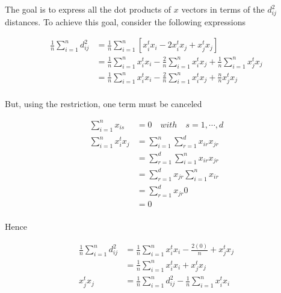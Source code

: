 \documentclass[12pt,journal]{IEEEtran}
\begin{document}
    The goal is to express all the dot products of $x$ vectors in terms of the
    $d_{ij}^2$ distances. To achieve this goal, consider the following
    expressions

    \begin{equation*}
        \begin{aligned}
            \frac{1}{n} \sum_{i=1}^n d_{ij}^2 &= \frac{1}{n} \sum_{i=1}^n [x_i^t x_i - 2 x_i^t x_j + x_j^t x_j]\\
            &=  \frac{1}{n} \sum_{i=1}^n x_i^t x_i - \frac{2}{n} \sum_{i=1}^n x_i^t x_j + \frac{1}{n} \sum_{i=1}^n x_j^t x_j\\
            &=  \frac{1}{n} \sum_{i=1}^n x_i^t x_i - \frac{2}{n} \sum_{i=1}^n x_i^t x_j + \frac{n}{n} x_j^t x_j \\
        \end{aligned}
    \end{equation*}

    But, using the restriction, one term must be canceled

    \begin{equation*}
        \begin{aligned}
              \sum_{i=1}^n x_{is} &= 0 \quad with \quad s = 1, \cdots, d\\
            \sum_{i=1}^n x_i^t x_j &= \sum_{i=1}^n \sum_{r=1}^d x_{ir} x_{jr}\\
                                   &= \sum_{r=1}^d \sum_{i=1}^n x_{ir} x_{jr}\\
                                   &= \sum_{r=1}^d x_{jr} \sum_{i=1}^n x_{ir}\\
                                   &= \sum_{r=1}^d x_{jr} 0\\
                                   &= 0\\
        \end{aligned}
    \end{equation*}

    Hence

    \begin{equation*}
        \begin{aligned}
            \frac{1}{n} \sum_{i=1}^n d_{ij}^2
            &=
            \frac{1}{n} \sum_{i=1}^n x_i^t x_i - \frac{2(0)}{n} + x_j^t x_j\\
            &=
            \frac{1}{n} \sum_{i=1}^n x_i^t x_i + x_j^t x_j\\
            x_j^t x_j &= \frac{1}{n} \sum_{i=1}^n d_{ij}^2 - \frac{1}{n} \sum_{i=1}^n x_i^t x_i
        \end{aligned}
    \end{equation*}
\end{document}
